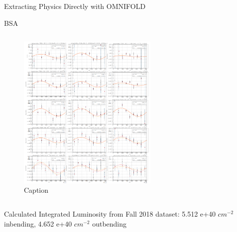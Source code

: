 \documentclass[aspectratio=169]{beamer}
\newcommand*{\myfont}{\fontfamily{lmtt}\selectfont}
\begin{document}
\begin{frame}{Extracting Physics Directly with OMNIFOLD}
                        {\myfont{\tiny    [ arxiv:1911.09107]   }}
                       

\end{frame}



\begin{frame}{BSA}

        
        \begin{columns}
                                
    
                \begin{figure}
                    \centering
                    \includegraphics[width=0.6\textwidth]{defense/BSA.png}
                    \caption{Caption}
                    \label{fig:enter-label}
                \end{figure}

        \end{columns}
       Calculated Integrated Luminosity from Fall 2018  dataset: 5.512 e+40 $cm^{-2}$ inbending, 4.652 e+40 $cm^{-2}$ outbending
\end{frame} 
\end{document}
